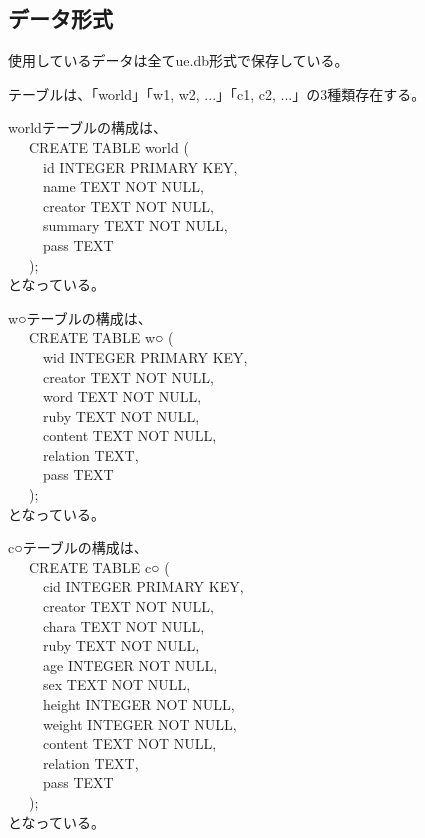 \documentclass[12pt,a4paper]{jarticle}
\begin{document}
\begin{ttfamily}
\subsection{データ形式}
使用しているデータは全てue.db形式で保存している。
\par テーブルは、「world」「w1, w2, ...」「c1, c2, ...」の3種類存在する。
\par worldテーブルの構成は、\\
 \ \ \ CREATE TABLE world (\\
 \ \ \ \ \ id INTEGER PRIMARY KEY,\\
 \ \ \ \ \ name TEXT NOT NULL,\\
 \ \ \ \ \ creator TEXT NOT NULL,\\
 \ \ \ \ \ summary TEXT NOT NULL,\\
 \ \ \ \ \ pass TEXT\\
 \ \ \ );\\
となっている。
\par w○テーブルの構成は、\\
 \ \ \ CREATE TABLE w○ (\\
 \ \ \ \ \ wid INTEGER PRIMARY KEY,\\
 \ \ \ \ \ creator TEXT NOT NULL,\\
 \ \ \ \ \ word TEXT NOT NULL,\\
 \ \ \ \ \ ruby TEXT NOT NULL,\\
 \ \ \ \ \ content TEXT NOT NULL,\\
 \ \ \ \ \ relation TEXT,\\
 \ \ \ \ \ pass TEXT\\
 \ \ \ );\\
となっている。
\par c○テーブルの構成は、\\
 \ \ \ CREATE TABLE c○ (\\
 \ \ \ \ \ cid INTEGER PRIMARY KEY,\\
 \ \ \ \ \ creator TEXT NOT NULL,\\
 \ \ \ \ \ chara TEXT NOT NULL,\\
 \ \ \ \ \ ruby TEXT NOT NULL,\\
 \ \ \ \ \ age INTEGER NOT NULL,\\
 \ \ \ \ \ sex TEXT NOT NULL,\\
 \ \ \ \ \ height INTEGER NOT NULL,\\
 \ \ \ \ \ weight INTEGER NOT NULL,\\
 \ \ \ \ \ content TEXT NOT NULL,\\
 \ \ \ \ \ relation TEXT,\\
 \ \ \ \ \ pass TEXT\\
 \ \ \ );\\
となっている。

\end{ttfamily}
\end{document}
